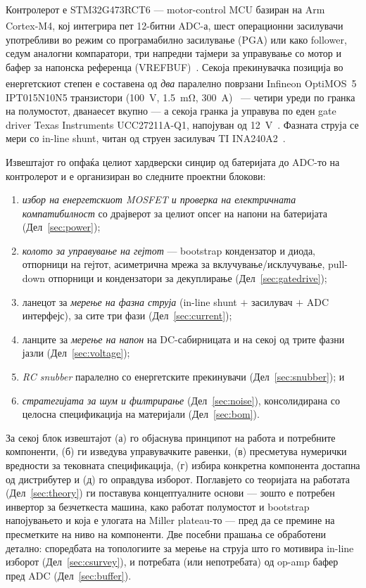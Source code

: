 \documentclass[journal,onecolumn,11pt]{IEEEtran}
\newcommand{\eng}[1]{#1}
\begin{document}
Контролерот е STM32G473RCT6 --- motor-control MCU базиран на
Arm\textsuperscript{\textregistered} Cortex\textsuperscript{\textregistered}-M4,
кој интегрира пет \mbox{12-битни} ADC-а, шест операционни засилувачи употребливи во
режим со програмабилно засилување (PGA) или како follower, седум аналогни
компаратори, три напредни тајмери за управување со мотор и бафер за напонска
референца (VREFBUF)~\cite{stm32g473ds}. Секоја прекинувачка позиција во енергетскиот
степен е составена од \emph{два} паралелно поврзани Infineon
OptiMOS\textsuperscript{\texttrademark}~5 IPT015N10N5 транзистори (\SI{100}{\volt},
\SI{1.5}{\milli\ohm}, \SI{300}{\ampere})~\cite{ipt015ds,ipt015part} --- четири уреди
по гранка на полумостот, дванаесет вкупно --- а секоја гранка ја управува по еден
gate driver Texas Instruments UCC27211A-Q1, напојуван од
\SI{12}{\volt}~\cite{ucc27211}. Фазната струја се мери со in-line shunt, читан од
струен засилувач TI INA240A2~\cite{ina240ds}.

Извештајот го опфаќа целиот хардверски синџир од батеријата до ADC-то на
контролерот и е организиран во следните проектни блокови:
\begin{enumerate}[leftmargin=1.4em]
  \item \emph{избор на енергетскиот MOSFET и проверка на електричната
        компатибилност} со драјверот за целиот опсег на напони на батеријата
        (Дел~\ref{sec:power});
  \item \emph{колото за управување на гејтот} --- bootstrap кондензатор и диода,
        отпорници на гејтот, асиметрична мрежа за вклучување/исклучување,
        pull-down отпорници и кондензатори за декуплирање (Дел~\ref{sec:gatedrive});
  \item ланецот за \emph{мерење на фазна струја} (in-line shunt $+$ засилувач $+$
        ADC интерфејс), за сите три фази (Дел~\ref{sec:current});
  \item ланците за \emph{мерење на напон} на DC-сабирницата и на секој од трите
        фазни јазли (Дел~\ref{sec:voltage});
  \item \emph{RC snubber} паралелно со енергетските прекинувачи
        (Дел~\ref{sec:snubber}); и
  \item \emph{стратегијата за шум и филтрирање} (Дел~\ref{sec:noise}), консолидирана
        со целосна спецификација на материјали (Дел~\ref{sec:bom}).
\end{enumerate}
За секој блок извештајот (а) го објаснува принципот на работа и потребните
компоненти, (б) ги изведува управувачките равенки, (в) пресметува нумерички
вредности за тековната спецификација, (г) избира конкретна компонента достапна од
дистрибутер и (д) го оправдува изборот. Поглавјето со теоријата на работата
(Дел~\ref{sec:theory}) ги поставува концептуалните основи --- зошто е потребен
инвертор за безчеткеста машина, како работат полумостот и bootstrap напојувањето и
која е улогата на \eng{Miller plateau}-то --- пред да се премине на пресметките на
ниво на компоненти. Две посебни прашања се обработени детално: споредбата на
топологиите за мерење на струја што го мотивира in-line изборот
(Дел~\ref{sec:csurvey}), и потребата (или непотребата) од op-amp бафер пред ADC
(Дел~\ref{sec:buffer}).
\end{document}
